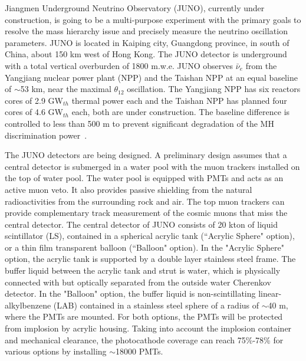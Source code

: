 Jiangmen Underground Neutrino Observatory (JUNO), currently under construction, is going to be a multi-purpose experiment with the primary goals to resolve the mass hierarchy issue and precisely measure the neutrino oscillation parameters.
JUNO is located in Kaiping city, Guangdong province, in south of China, about 150 km west of Hong Kong. The JUNO detector is underground with a total vertical overburden of 1800 m.w.e. JUNO observes $\bar\nu_e$ from the Yangjiang nuclear power plant (NPP) and the Taishan NPP at an equal baseline of $\sim$53 km, near the maximal $\theta_{12}$ oscillation. The Yangjiang NPP has six reactors cores of 2.9 GW$_{th}$ thermal power each and the Taishan NPP has planned four cores of 4.6 GW$_{th}$ each, both are under construction. The baseline difference is controlled to less than 500 m to prevent significant degradation of the MH discrimination power~\cite{Li-PRD13}.

The JUNO detectors are being designed. A preliminary design assumes that a central detector is submerged in a water pool with the muon trackers installed on the top of water pool. The water pool is equipped with PMTs and acts as an active muon veto. It also provides passive shielding from the natural radioactivities from the surrounding rock and air. The top muon trackers can provide complementary track measurement of the cosmic muons that miss the central detector. The central detector of JUNO consists of 20 kton of liquid scintillator (LS), contained in a spherical acrylic tank (``Acrylic Sphere" option), or a thin film transparent balloon (``Balloon" option). In the "Acrylic Sphere" option, the acrylic tank is supported by a double layer stainless steel frame. The buffer liquid between the acrylic tank and strut is water, which is physically connected with but optically separated from the outside water Cherenkov detector. In the "Balloon" option, the buffer liquid is non-scintillating linear-alkylbenzene (LAB) contained in a stainless steel sphere of a radius of $\sim $40 m, where the PMTs are mounted. For both options, the PMTs will be protected from implosion by acrylic housing. Taking into account the implosion container and mechanical clearance, the photocathode coverage can reach 75\%-78\% for various options by installing $\sim$18000 PMTs.

